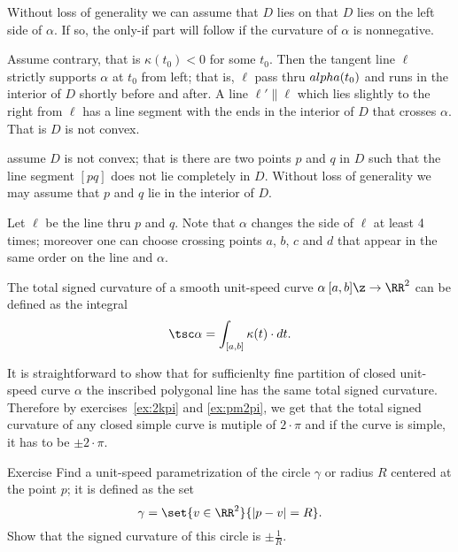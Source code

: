 Without loss of generality we can assume that $D$ lies on that $D$ lies on the left side of $\alpha$.
If so,
the only-if part will follow if the curvature of $\alpha$ is nonnegative.

Assume contrary, that is $\kappa(t_0)<0$ for some $t_0$.
Then the tangent line $\ell$ strictly supports $\alpha$ at $t_0$ from left;
that is, $\ell$ pass thru $\\alpha(t_0)$ and runs in the interior of $D$ shortly before and after.
A line $\ell'\parallel \ell$ which lies slightly to the right from $\ell$ has a line segment with the ends in the interior of $D$ that crosses $\alpha$.
That is $D$ is not convex.

 assume $D$ is not convex; that is there are two points $p$ and $q$ in $D$ such that the line segment $[pq]$ does not lie completely in $D$.
Without loss of generality we may assume that $p$ and $q$ lie in the interior of $D$.

Let $\ell$ be the line thru $p$ and $q$.
Note that $\alpha$ changes the side of $\ell$ at least 4 times;
moreover one can choose crossing points $a$, $b$, $c$ and $d$ that appear in the same order on the line and $\alpha$.













The total signed curvature of a smooth unit-speed curve $\alpha\:[a,b]\z\to\RR^2$ can be defined as the integral
\[\tsc\alpha=\int_{[a,b]}\kappa(t)\cdot dt.\]

It is straightforward to show that for sufficienlty fine partition of closed unit-speed curve $\alpha$ the inscribed polygonal line has the same total signed curvature.
Therefore by exercises~\ref{ex:2kpi} and \ref{ex:pm2pi},
we get that the total signed curvature of any closed simple curve is mutiple of $2\cdot\pi$ and if the curve is simple, it has to be $\pm2\cdot\pi$.

\begin{thm}{Exercise}\label{ex:curvature-of-circle}
Find a unit-speed parametrization of the circle $\gamma$ or radius $R$ centered at the point $p$;
it is defined as the set 
\[\gamma=\set{v\in\RR^2}{|p-v|=R}.\]
Show that the signed curvature of this circle is $\pm \tfrac1R$.
\end{thm}

